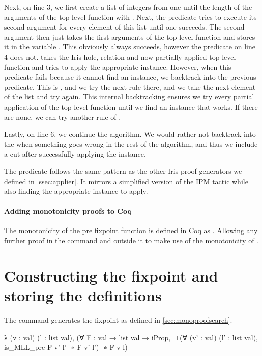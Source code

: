 \documentclass[thesis.tex]{subfiles}
\begin{document}
Next, on line 3, we first create a list of integers from one until the length of the arguments of the top-level function with . Next, the  predicate tries to execute its second argument for every element of this list until one succeeds. The second argument then just takes the first  arguments of the top-level function and stores it in the variable . This obviously always succeeds, however the predicate on line 4 does not.  takes the Iris hole, relation and now partially applied top-level function and tries to apply the appropriate  instance. However, when this predicate fails because it cannot find an  instance, we backtrack into the previous predicate. This is , and we try the next rule there, and we take the next element of the list and try again. This internal backtracking ensures we try every partial application of the top-level function until we find an  instance that works. If there are none, we can try another rule of .

Lastly, on line 6, we continue the algorithm. We would rather not backtrack into the  when something goes wrong in the rest of the algorithm, and thus we include a cut after successfully applying the  instance.

The predicate  follows the same pattern as the other Iris proof generators we defined in \cref{ssec:applier}. It mirrors a simplified version of the IPM  tactic while also finding the appropriate  instance to apply.

\paragraph{Adding monotonicity proofs to Coq}
The monotonicity of the pre fixpoint function is defined in Coq as . Allowing any further proof in the command and outside it to make use of the monotonicity of .

\section{Constructing the fixpoint and storing the definitions}\label{sec:constrfixpoint}
The command  generates the fixpoint as defined in \cref{sec:monoproofsearch}.
\begin{coqcode}
  λ (v : val) (l : list val),
    (∀ F : val → list val → iProp, 
      □ (∀ (v' : val) (l' : list val), 
            is_MLL_pre F v' l' -∗ F v' l') 
      -∗ F v l)
\end{coqcode}
\end{document}
